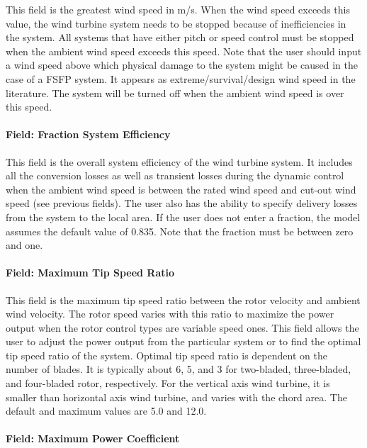 This field is the greatest wind speed in m/s. When the wind speed exceeds this value, the wind turbine system needs to be stopped because of inefficiencies in the system. All systems that have either pitch or speed control must be stopped when the ambient wind speed exceeds this speed. Note that the user should input a wind speed above which physical damage to the system might be caused in the case of a FSFP system. It appears as extreme/survival/design wind speed in the literature. The system will be turned off when the ambient wind speed is over this speed.

\paragraph{Field: Fraction System Efficiency}\label{field-fraction-system-efficiency}

This field is the overall system efficiency of the wind turbine system. It includes all the conversion losses as well as transient losses during the dynamic control when the ambient wind speed is between the rated wind speed and cut-out wind speed (see previous fields). The user also has the ability to specify delivery losses from the system to the local area. If the user does not enter a fraction, the model assumes the default value of 0.835. Note that the fraction must be between zero and one.

\paragraph{Field: Maximum Tip Speed Ratio}\label{field-maximum-tip-speed-ratio}

This field is the maximum tip speed ratio between the rotor velocity and ambient wind velocity. The rotor speed varies with this ratio to maximize the power output when the rotor control types are variable speed ones. This field allows the user to adjust the power output from the particular system or to find the optimal tip speed ratio of the system. Optimal tip speed ratio is dependent on the number of blades. It is typically about 6, 5, and 3 for two-bladed, three-bladed, and four-bladed rotor, respectively. For the vertical axis wind turbine, it is smaller than horizontal axis wind turbine, and varies with the chord area. The default and maximum values are 5.0 and 12.0.

\paragraph{Field: Maximum Power Coefficient}\label{field-maximum-power-coefficient}

